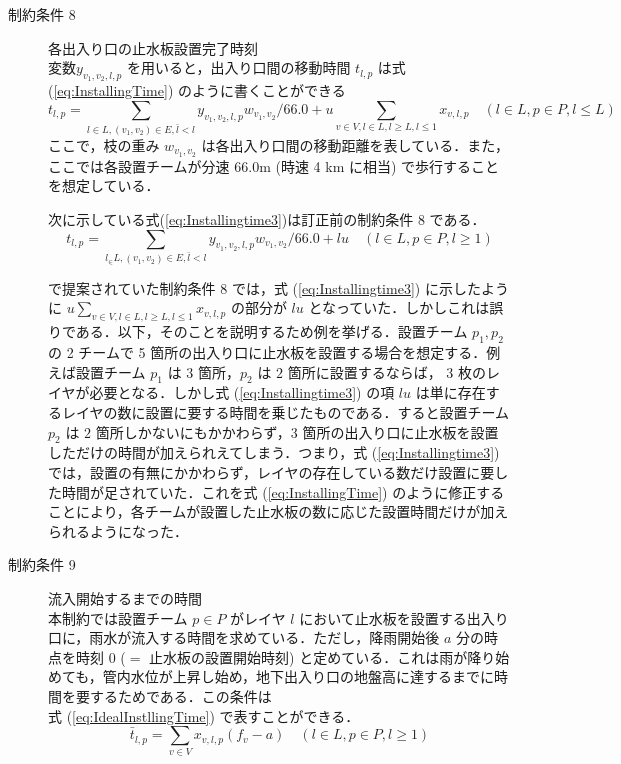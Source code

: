 \documentclass[a4paper,12pt,fleqn]{jarticle}
\begin{document}
\begin{description}
\item [制約条件 8] 各出入り口の止水板設置完了時刻\\
  変数$y_{v_1,v_2,l,p}$ を用いると，出入り口間の移動時間 $t_{l,p}$ は式(\ref{eq:InstallingTime}) のように書くことができる
  \newpage
  \begin{equation}
    t_{l,p}=\displaystyle\sum_{l \in L,(v_1,v_2) \in E,\bar{l} < l}y_{v_1,v_2,l,p}w_{v_1,v_2}/66.0 + u \displaystyle\sum_{v \in V,l \in L,l \geq L,l \leq 1}x_{v,l,p}
    \quad (l \in L,p \in P,l \leq L)\label{eq:InstallingTime}
  \end{equation}
  ここで，枝の重み $w_{v_1,v_2}$ は各出入り口間の移動距離を表している．また，ここでは各設置チームが分速 $66.0$m (時速 4 km に相当) で歩行することを想定している．

  次に示している式(\ref{eq:Installingtime3})は訂正前の制約条件 8 である．
  \begin{equation}
    t_{l,p}=\displaystyle\sum_{l_ \in L,(v_1,v_2)\in E,\bar{l} < l}y_{v_1,v_2,l,p}w_{v_1,v_2}/66.0+lu
    \quad (l \in L,p \in P,l \geq 1)\label{eq:Installingtime3}
  \end{equation}
  
  \cite{馬谷さん卒論} で提案されていた制約条件 8 では，式 (\ref{eq:Installingtime3}) に示したように $u \displaystyle\sum_{v \in V,l \in L,l \geq L,l \leq 1}x_{v,l,p}$ の部分が $lu$ となっていた．しかしこれは誤りである．以下，そのことを説明するため例を挙げる．設置チーム $p_1,p_2$ の 2 チームで 5 箇所の出入り口に止水板を設置する場合を想定する．例えば設置チーム $p_1$ は $3$ 箇所，$p_2$ は $2$ 箇所に設置するならば， 3 枚のレイヤが必要となる．しかし式 (\ref{eq:Installingtime3}) の項 $lu$ は単に存在するレイヤの数に設置に要する時間を乗じたものである．すると設置チーム $p_2$ は $2$ 箇所しかないにもかかわらず，3 箇所の出入り口に止水板を設置しただけの時間が加えられえてしまう．つまり，式 (\ref{eq:Installingtime3})では，設置の有無にかかわらず，レイヤの存在している数だけ設置に要した時間が足されていた．これを式 (\ref{eq:InstallingTime}) のように修正することにより，各チームが設置した止水板の数に応じた設置時間だけが加えられるようになった．

  
\item [制約条件 9] 流入開始するまでの時間\\
  本制約では設置チーム $p \in P$ がレイヤ $l$ において止水板を設置する出入り口に，雨水が流入する時間を求めている．ただし，降雨開始後 $a$ 分の時点を時刻 $0$ ($=$ 止水板の設置開始時刻) と定めている．これは雨が降り始めても，管内水位が上昇し始め，地下出入り口の地盤高に達するまでに時間を要するためである．この条件は\\式 (\ref{eq:IdealInstllingTime}) で表すことができる．
  \begin{equation}
    \bar{t}_{l,p} = \displaystyle\sum_{v \in V}x_{v,l,p}(f_v- a)
    \quad(l \in L,p \in P,l \geq 1)\label{eq:IdealInstllingTime}
  \end{equation}


\end{description}
\end{document}

